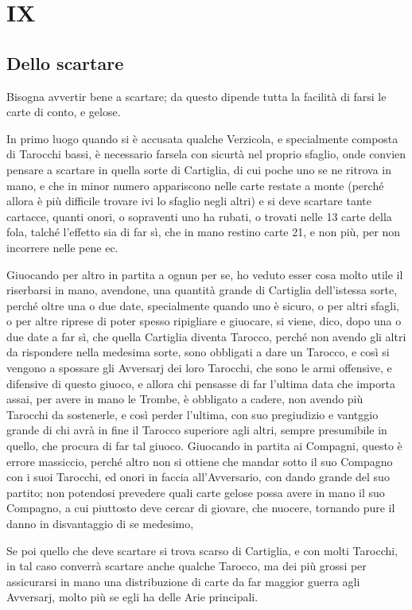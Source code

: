 \documentclass[11pt,a6paper]{article}
\begin{document}
\section{IX}
\subsection*{Dello scartare}

Bisogna avvertir bene a scartare; da
questo dipende tutta la facilità di farsi le carte di conto, e gelose.

In primo luogo quando si è accusata qualche Verzicola, e specialmente composta di Tarocchi bassi, è necessario farsela con sicurtà nel proprio sfaglio, onde convien pensare a scartare in quella sorte di
Cartiglia, di cui poche uno se ne ritrova in mano, e che in minor numero appariscono nelle carte restate a monte (perché allora è più difficile trovare ivi lo sfaglio negli altri) e si deve scartare tante cartacce, quanti onori, o sopraventi uno ha rubati, o trovati nelle 13 carte della fola, talché l'effetto sia di far sì, che in mano restino carte 21, e non più, per non incorrere nelle pene ec.

Giuocando per altro in partita a ognun per se, ho veduto esser cosa molto utile il
riserbarsi in mano, avendone, una quantità grande di Cartiglia dell'istessa sorte, perché oltre una o due date, specialmente quando uno è sicuro, o per altri sfagli, o per altre riprese di poter spesso ripigliare e giuocare, si viene, dico, dopo una o due date a far sì, che quella Cartiglia diventa Tarocco, perché non avendo gli altri da rispondere nella medesima sorte, sono obbligati a dare un Tarocco, e così si vengono a spossare gli Avversarj dei loro Tarocchi, che sono le armi offensive, e difensive di questo giuoco, e allora chi pensasse di far l'ultima data che importa assai, per avere
in mano le Trombe, è obbligato a cadere, non avendo più Tarocchi da sostenerle, e così perder l'ultima, con suo pregiudizio e vantggio grande di chi avrà in fine il Tarocco superiore agli altri, sempre presumibile in quello, che procura di far tal giuoco. Giuocando in partita ai Compagni, questo è errore massiccio, perché altro non si ottiene che mandar sotto il suo Compagno con i suoi Tarocchi, ed onori in faccia all'Avversario, con dando grande del suo partito; non potendosi prevedere quali carte gelose possa avere in mano il suo Compagno, a cui piuttosto deve cercar di giovare, che nuocere, tornando pure il danno in disvantaggio di se medesimo,

Se poi quello che deve scartare si trova scarso di Cartiglia, e con molti Tarocchi, in tal caso converrà scartare anche qualche Tarocco, ma dei più grossi per assicurarsi in mano una distribuzione di carte da far maggior guerra agli Avversarj, molto più se egli ha delle Arie principali.
\end{document}
